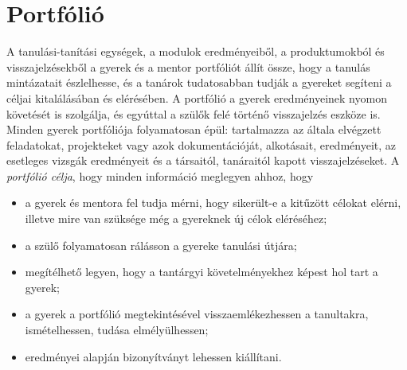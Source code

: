 \hypertarget{portfolio}{%
\section{Portfólió}\label{portfolio}}

A tanulási-tanítási egységek, a modulok eredményeiből, a produktumokból
és visszajelzésekből a gyerek és a mentor portfóliót állít össze, hogy a
tanulás mintázatait észlelhesse, és a tanárok tudatosabban tudják a
gyereket segíteni a céljai kitalálásában és elérésében. A portfólió a
gyerek eredményeinek nyomon követését is szolgálja, és egyúttal a szülők
felé történő visszajelzés eszköze is. Minden gyerek portfóliója
folyamatosan épül: tartalmazza az általa elvégzett feladatokat,
projekteket vagy azok dokumentációját, alkotásait, eredményeit, az
esetleges vizsgák eredményeit és a társaitól, tanáraitól kapott
visszajelzéseket. A \emph{portfólió célja}, hogy minden információ
meglegyen ahhoz, hogy

\begin{itemize}
\tightlist
\item
  a gyerek és mentora fel tudja mérni, hogy sikerült-e a kitűzött
  célokat elérni, illetve mire van szüksége még a gyereknek új célok
  eléréséhez;
\item
  a szülő folyamatosan rálásson a gyereke tanulási útjára;
\item
  megítélhető legyen, hogy a tantárgyi követelményekhez képest hol tart
  a gyerek;
\item
  a gyerek a portfólió megtekintésével visszaemlékezhessen a tanultakra,
  ismételhessen, tudása elmélyülhessen;
\item
  eredményei alapján bizonyítványt lehessen kiállítani.
\end{itemize}

